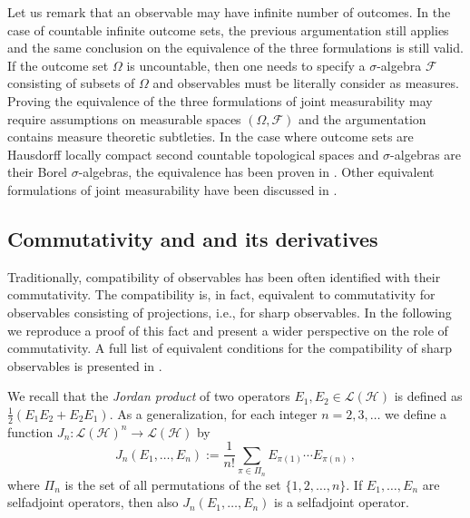 \documentclass[12pt]{iopart}
\theoremstyle{definition}
\newcommand{\half}{\tfrac{1}{2}} %
\newcommand{\lh}{\mathcal{L(H)}} %
\begin{document}
Let us remark that an observable may have infinite number of outcomes.
In the case of countable infinite outcome sets, the previous argumentation still applies and the same conclusion on the equivalence of the three formulations is still valid.
If the outcome set $\Omega$ is uncountable, then one needs to specify a $\sigma$-algebra $\mathcal{F}$ consisting of subsets of $\Omega$ and observables must be literally consider as measures.
Proving the equivalence of the three formulations of joint measurability may require assumptions on measurable spaces $(\Omega,\mathcal{F})$ and the argumentation contains measure theoretic subtleties.
In the case where outcome sets are Hausdorff locally compact second countable topological spaces and $\sigma$-algebras are their Borel $\sigma$-algebras, the equivalence has been proven in \cite{AlCaHeTo09}.
Other equivalent formulations of joint measurability have been discussed in \cite{LaYl04}.

\subsection{Commutativity and and its derivatives}\label{sec:comma}

Traditionally, compatibility of observables has been often identified with their commutativity. The compatibility is, in fact, equivalent to commutativity for observables consisting of projections, i.e., for sharp observables. 
In the following we reproduce a proof of this fact and present a wider perspective on the role of commutativity.
A full list of equivalent conditions for the compatibility of sharp observables is presented in \cite{Lahti03}.  

We recall that the \emph{Jordan product} of two operators $E_1,E_2\in\lh$ is defined as $\half (E_1E_2+E_2E_1)$.
As a generalization, for each integer $n=2,3,\ldots$ we define a function $J_{n}:\lh^n\to\lh$ by
\begin{equation}\label{eq:jordan}
J_n(E_1,\ldots,E_n) := \frac{1}{n!} \sum_{\pi\in\Pi_n} E_{\pi(1)}\cdots E_{\pi(n)} \, ,
\end{equation}
where $\Pi_n$ is the set of all permutations of the set $\{1,2,\ldots,n\}$.
If $E_1,\ldots,E_n$ are selfadjoint operators, then also $J_n(E_1,\ldots,E_n)$ is a selfadjoint operator. 
\end{document}
